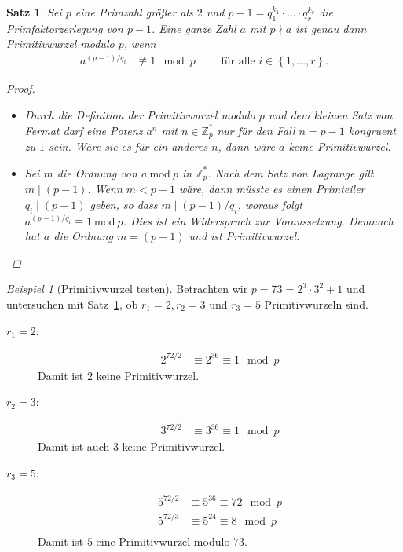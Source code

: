 \documentclass[
  a4paper,
  11pt,
]{scrartcl}
\theoremstyle{plain}
\newtheorem{satz}{Satz}
\theoremstyle{definition}
\theoremstyle{remark}
\newtheorem{beispiel}{Beispiel}
\newcommand{\Z}{\mathbb{Z}}
\newcommand{\Mod}[1]{\ \mathrm{mod}\ #1}
\begin{document}
\begin{satz}\label{satz:primitivwurzeltest}
  Sei $p$ eine Primzahl größer als $2$ und
  $p-1 = q_1^{k_1} \cdot \ldots \cdot q_r^{k_r}$ die Primfaktorzerlegung von
  $p-1$. Eine ganze Zahl $a$ mit $p \nmid a$ ist genau dann Primitivwurzel
  modulo $p$, wenn
  \begin{align*}
    a^{(p-1)/q_i} & \not\equiv 1 \mod p \qquad \text{ für alle } i \in \left\{1, \ldots, r\right\}.
  \end{align*}

  \begin{proof}
    \begin{itemize}
      \item[„$\Rightarrow$“] Durch die Definition der Primitivwurzel modulo $p$
        und dem kleinen Satz von Fermat darf eine Potenz $a^n$ mit
        $n \in \Z_p^*$ nur für den Fall $n = p-1$ kongruent zu $1$ sein. Wäre
        sie es für ein anderes $n$, dann wäre $a$ keine Primitivwurzel.
      \item[„$\Leftarrow$“] Sei $m$ die Ordnung von $a \Mod{p}$ in $\Z_p^*$.
        Nach dem Satz von Lagrange gilt $m \mid (p-1)$. Wenn $m < p-1$ wäre,
        dann müsste es einen Primteiler $q_i \mid (p-1)$ geben, so dass
        $m \mid (p-1)/q_i$, woraus folgt $a^{(p-1)/q_i} \equiv 1 \Mod{p}$. Dies
        ist ein Widerspruch zur Voraussetzung. Demnach hat $a$ die Ordnung
        $m = (p-1)$ und ist Primitivwurzel.
    \end{itemize}
  \end{proof}
\end{satz}

\begin{beispiel}[Primitivwurzel testen]\label{bsp:primitivwurzel_testen}
  Betrachten wir $p = 73 = 2^3 \cdot 3^2 + 1$ und untersuchen mit
  Satz~\ref{satz:primitivwurzeltest}, ob $r_1 = 2, r_2 = 3$ und $r_3 = 5$
  Primitivwurzeln sind.

  \begin{description}
    \item[$r_1 = 2$:]
      \begin{align*}
        2^{72/2}
        & \equiv 2^{36} \equiv 1 \mod p
      \end{align*}
      Damit ist $2$ keine Primitivwurzel.
    \item[$r_2 = 3$:]
      \begin{align*}
        3^{72/2}
        & \equiv 3^{36} \equiv 1 \mod p
      \end{align*}
      Damit ist auch $3$ keine Primitivwurzel.
    \item[$r_3 = 5$:]
      \begin{align*}
        5^{72/2}
        & \equiv 5^{36} \equiv 72 \mod p\\
        5^{72/3}
        & \equiv 5^{24} \equiv 8 \mod p\\
      \end{align*}
      Damit ist $5$ eine Primitivwurzel modulo $73$.
  \end{description}
\end{beispiel}
\end{document}
